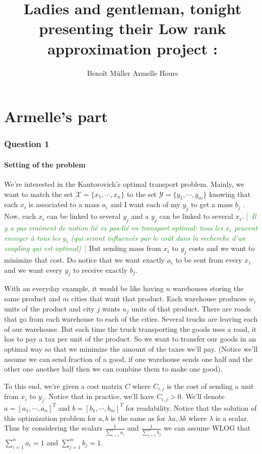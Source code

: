 \documentclass[a4paper]{article}
\title{Ladies and gentleman, tonight presenting their Low rank approximation project : }
\author{{\Huge Benoît Müller} {\Huge Armelle Hours}}
\theoremstyle{definition}
\theoremstyle{remark}
\newcommand{\com}[1]{\textcolor{ForestGreen}{[~\emph{#1}~]}}
\newcommand{\X}{\mathcal{X}}
\newcommand{\Y}{\mathcal{Y}}
\begin{document}
\maketitle
\part*{Armelle's part}
\section*{Question 1}
\subsection*{Setting of the problem}
We're interested in the Kantorovich's optimal transport problem. Mainly, we want to match the set $\X=\{x_1,\cdots, x_n\}$ to the set $\Y=\{y_1,\cdots, y_m\}$ knowing that each $x_i$ is associated to a mass $a_i$ and I want each of my $y_j$ to get a mass $b_j$ . Now, each $x_i$ can be linked to several $y_j$ and a $y_j$ can be linked to several $x_i$.
\com{Il y a pas vraiment de notion lié vs pas-lié en transport optimal: tous les $x_i$ peuvent envoyer à tous les $y_i$ (qui seront influencés par le coût dans la recherche d'un coupling qui est optimal)}
But sending mass from $x_i$ to $y_j$ costs and we want to minimize that cost. Do notice that we want exactly $a_i$ to be sent from every $x_i$ and we want every $y_j$ to receive exactly $b_j$.

With an everyday example, it would be like having $n$ warehouses storing the same product and $m$ cities that want that product. Each warehouse produces $w_i$ units of the product and city $j$ wants $u_j$ units of that product. There are roads that go from each warehouse to each of the cities. Several trucks are leaving each of our warehouse. But each time the truck transporting the goods uses a road, it has to pay a tax per unit of the product. So we want to transfer our goods in an optimal way so that we minimize the amount of the taxes we'll pay. (Notice we'll assume we can send fraction of a good, if one warehouse sends one half and the other one another half then we can combine them to make one good). 

To this end, we're given a cost matrix $C$ where $C_{i,j}$ is the cost of sending a unit from $x_i$ to $y_j$. Notice that in practice, we'll have $C_{i,j}>0$.  We'll denote $a=[a_1,\cdots, a_n]^T$ and $b=[b_1,\cdots, b_m]^T$ for readability. Notice that the solution of this optimization problem for $a,b$ is the same as for $\lambda a,\lambda b$ where $\lambda$ is a scalar. Thus by considering the scalars $\frac{1}{\sum\limits_{i=1}^n a_i}$ and $\frac{1}{\sum\limits_{j=1}^m b_j}$ we can assume WLOG that $\sum\limits_{i=1}^n a_i=1$ and $\sum\limits_{j=1}^m b_j=1$. 
\end{document}
